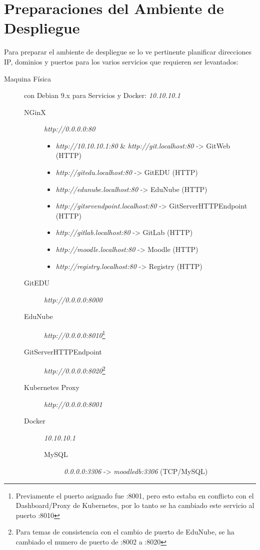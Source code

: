 \section{Preparaciones del Ambiente de Despliegue}
Para preparar el ambiente de despliegue se lo ve pertinente planificar direcciones IP, dominios y puertos para los varios servicios que requieren ser levantados:
\begin{description}
	\item[Maquina Física] con Debian 9.x para Servicios y Docker: \textit{10.10.10.1}
    \begin{description}
    	\item[NGinX] \textit{http://0.0.0.0:80} 
        \begin{itemize}
            \item \textit{http://10.10.10.1:80} \& \textit{http://git.localhost:80} -> GitWeb (HTTP)
            \item \textit{http://gitedu.localhost:80} -> GitEDU (HTTP)
            \item \textit{http://edunube.localhost:80} -> EduNube (HTTP)
            \item \textit{http://gitsrvendpoint.localhost:80} -> GitServerHTTPEndpoint (HTTP)
            \item \textit{http://gitlab.localhost:80} -> GitLab (HTTP)
            \item \textit{http://moodle.localhost:80} -> Moodle (HTTP)
            \item \textit{http://registry.localhost:80} -> Registry (HTTP)
        \end{itemize}
        \item[GitEDU] \textit{http://0.0.0.0:8000}
        \item[EduNube] \textit{http://0.0.0.0:8010}\footnote{Previamente el puerto asignado fue :8001, pero esto estaba en conflicto con el Dashboard/Proxy de Kubernetes, por lo tanto se ha cambiado este servicio al puerto :8010}
        \item[GitServerHTTPEndpoint] \textit{http://0.0.0.0:8020}\footnote{Para temas de consistencia con el cambio de puerto de EduNube, se ha cambiado el numero de puerto de :8002 a :8020}
        \item[Kubernetes Proxy] \textit{http://0.0.0.0:8001}
        \item[Docker] \textit{10.10.10.1}
        \begin{description}
        	\item[MySQL] \textit{0.0.0.0:3306} -> \textit{moodledb:3306} (TCP/MySQL)

\end{description}
\end{description}
\end{description}
